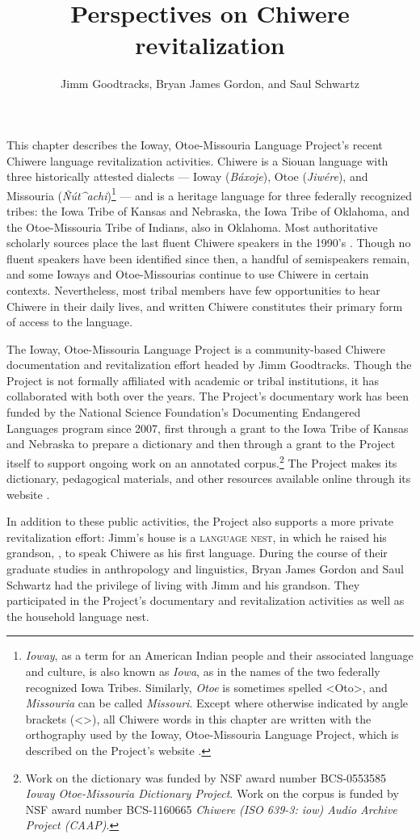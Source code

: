 \documentclass[output=paper]{LSP/langsci}
\author{Jimm Goodtracks, Bryan James Gordon, and Saul Schwartz}
\title{Perspectives on Chiwere revitalization}
\begin{document}
This chapter describes the Ioway, Otoe-Missouria Language Project's recent Chiwere language revitalization activities. Chiwere is a Siouan language with three historically attested dialects --- Ioway (\emph{Báxoje}), Otoe (\emph{Jiwére}), and Missouria (\emph{\~Nút\^{ }achi})\footnote{\emph{Ioway}, as a term for an American Indian people and their associated language and culture, is also known as \emph{Iowa}, as in the names of the two federally recognized Iowa Tribes. Similarly, \emph{Otoe} is sometimes spelled <Oto>, and \emph{Missouria} can be called \emph{Missouri}. Except where otherwise indicated by angle brackets (<>), all Chiwere words in this chapter are written with the orthography used by the Ioway, Otoe-Missouria Language Project, which is described on the Project's website \citep{GoodtracksND}.} --- and is a heritage language for three federally recognized tribes: the Iowa Tribe of Kansas and Nebraska, the Iowa Tribe of Oklahoma, and the Otoe-Missouria Tribe of Indians, also in Oklahoma. Most authoritative scholarly sources place the last fluent Chiwere speakers in the 1990's \citep{LewisSimonsFennig2013, ParksRankin2001}. Though no fluent speakers have been identified since then, a handful of semispeakers remain, and some Ioways and Otoe-Missourias continue to use Chiwere in certain contexts. Nevertheless, most tribal members have few opportunities to hear Chiwere in their daily lives, and written Chiwere constitutes their primary form of access to the language.

The Ioway, Otoe-Missouria Language Project is a community-based Chiwere documentation and revitalization effort headed by Jimm Goodtracks. Though the Project is not formally affiliated with academic or tribal institutions, it has collaborated with both over the years. The Project's documentary work has been funded by the National Science Foundation's Documenting Endangered Languages program since 2007, first through a grant to the Iowa Tribe of Kansas and Nebraska to prepare a dictionary and then through a grant to the Project itself to support ongoing work on an annotated corpus.\footnote{Work on the dictionary was funded by NSF award number BCS-0553585 \emph{Ioway Otoe-Missouria Dictionary Project}. Work on the corpus is funded by NSF award number BCS-1160665 \emph{Chiwere (ISO 639-3: iow) Audio Archive Project (CAAP)}.}  The Project makes its dictionary, pedagogical materials, and other resources available online through its website \citep{GoodtracksND}.

In addition to these public activities, the Project also supports a more private revitalization effort: Jimm's house is a \textsc{language nest}, in which he raised his grandson, , to speak Chiwere as his first language. During the course of their graduate studies in anthropology and linguistics, Bryan James Gordon and Saul Schwartz had the privilege of living with Jimm and his grandson. They participated in the Project's documentary and revitalization activities as well as the household language nest.
\end{document}
